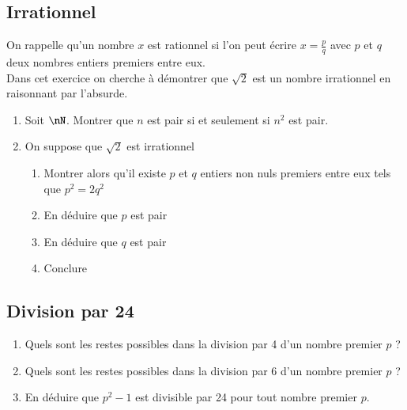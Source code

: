 \documentclass[oneside,12pt]{article}          %
\begin{document}
\subsection{Irrationnel}
On rappelle qu'un nombre $x$ est rationnel si l'on peut écrire $x=\frac{p}{q}$ avec $p$ et $q$ deux nombres entiers premiers entre eux.\\
Dans cet exercice on cherche à démontrer que $\sqrt{2}$ est un nombre irrationnel en raisonnant par l'absurde.

\begin{enumerate}
    \item Soit $\nN$. Montrer que $n$ est pair si et seulement si $n^2$ est pair.
    \item On suppose que $\sqrt{2}$ est irrationnel
    \begin{enumerate}
        \item Montrer alors qu'il existe $p$ et $q$ entiers non nuls premiers entre eux tels que $p^2=2q^2$
        \item En déduire que $p$ est pair
        \item En déduire que $q$ est pair
        \item Conclure
    \end{enumerate}
\end{enumerate}



\subsection{Division par 24}
\begin{enumerate}
    \item Quels sont les restes possibles dans la division par 4 d'un nombre premier $p$ ?
    \item Quels sont les restes possibles dans la division par 6 d'un nombre premier $p$ ?
    \item En déduire que $p^2-1$ est divisible par 24 pour tout nombre premier $p$.
\end{enumerate}
\end{document}
